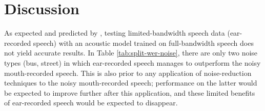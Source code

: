 \section{Discussion}
\label{chap4:discussion}

% 
% 

As expected and predicted by \cite{morales:05b}, testing limited-bandwidth speech data (ear-recorded speech) with an acoustic model trained on full-bandwidth speech does not yield accurate results.  In Table \ref{tab:split-wer-noise}, there are only two noise types (bus, street) in which ear-recorded speech manages to outperform the noisy mouth-recorded speech.  This is also prior to any application of noise-reduction techniques to the noisy mouth-recorded speech; performance on the latter would be expected to improve further after this application, and these limited benefits of ear-recorded speech would be expected to disappear.

